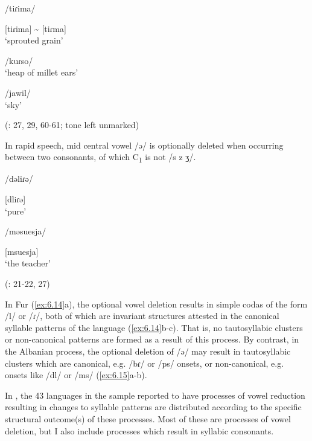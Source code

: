 \ea  /tiɾima/

[tiɾima] {\textasciitilde} [tiɾma]\\
\glt ‘sprouted grain’

\ex  /kuɾso/\\
\glt ‘heap of millet ears’

\ex  /jawil/\\
\glt ‘sky’

(\citealt{Jakobi1990}: 27, 29, 60-61; tone left unmarked)
\z
\z

\ea\label{ex:6.15}

  In rapid speech, mid central vowel /ə/ is optionally deleted when occurring between two consonants, of which C\textsubscript{1} is not /s z ʒ/.

\ea  /dəliɾə/

[dliɾə]\\
\glt ‘pure’

\ex  /məsuesja/

[msuesja]\\
\glt ‘the teacher’

(\citealt{Klippenstein2010}: 21-22, 27)
\z
\z

  In Fur (\ref{ex:6.14}a), the optional vowel deletion results in simple codas of the form /l/ or /ɾ/, both of which are invariant structures attested in the canonical syllable patterns of the language (\ref{ex:6.14}b-c). That is, no tautosyllabic clusters or non-canonical patterns are formed as a result of this process. By contrast, in the Albanian process, the optional deletion of /ə/ may result in tautosyllabic clusters which are canonical, e.g. /bɾ/ or /ps/ onsets, or non-canonical, e.g. onsets like /dl/ or /ms/ (\ref{ex:6.15}a-b).

  In , the 43 languages in the sample reported to have processes of vowel reduction resulting in changes to syllable patterns are distributed according to the specific structural outcome(s) of these processes. Most of these are processes of vowel deletion, but I also include processes which result in syllabic consonants.


